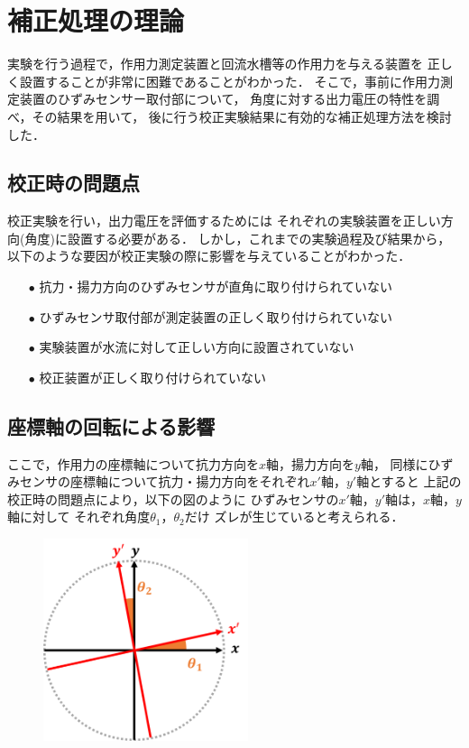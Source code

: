 \documentclass[twocolumn,a4j]{jsarticle}
\begin{document}
\newpage

\section{補正処理の理論}
実験を行う過程で，作用力測定装置と回流水槽等の作用力を与える装置を
正しく設置することが非常に困難であることがわかった．
そこで，事前に作用力測定装置のひずみセンサー取付部について，
角度に対する出力電圧の特性を調べ，その結果を用いて，
後に行う校正実験結果に有効的な補正処理方法を検討した．\\

\subsection{校正時の問題点}
校正実験を行い，出力電圧を評価するためには
それぞれの実験装置を正しい方向(角度)に設置する必要がある．
しかし，これまでの実験過程及び結果から，
以下のような要因が校正実験の際に影響を与えていることがわかった．

\begin{itemize}
    \item [$\bullet$] 抗力・揚力方向のひずみセンサが直角に取り付けられていない
    \item [$\bullet$] ひずみセンサ取付部が測定装置の正しく取り付けられていない
    \item [$\bullet$] 実験装置が水流に対して正しい方向に設置されていない
    \item [$\bullet$] 校正装置が正しく取り付けられていない
\end{itemize}

\subsection{座標軸の回転による影響}
ここで，作用力の座標軸について抗力方向を$x軸$，揚力方向を$y$軸，
同様にひずみセンサの座標軸について抗力・揚力方向をそれぞれ$x'$軸，$y'$軸とすると
上記の校正時の問題点により，以下の図のように
ひずみセンサの$x'$軸，$y'$軸は，$x$軸，$y$軸に対して
それぞれ角度$\theta_1$，$\theta_2$だけ
ズレが生じていると考えられる．\\

\begin{figure}[htbp]
    \footnotesize
    \begin{center}
        \includegraphics[width=60mm]{../images/image_1.png}
        \caption{}
    \end{center}
\end{figure}
\end{document}
